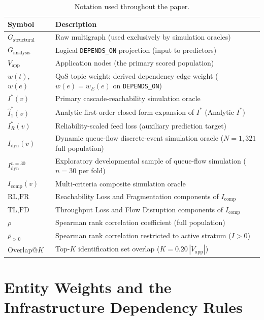 \documentclass[preprint,3p]{elsarticle}
\begin{document}
\begin{table}[htbp]
\centering
\small
\caption{Notation used throughout the paper.}
\label{tab:supp-notation}
\begin{tabular}{ll}
\toprule
\textbf{Symbol} & \textbf{Description} \\
\midrule
$G_{\text{structural}}$ & Raw multigraph (used exclusively by simulation oracles) \\
$G_{\text{analysis}}$   & Logical \texttt{DEPENDS\_ON} projection (input to predictors) \\
$V_{\text{app}}$        & Application nodes (the primary scored population) \\
$w(t)$, $w(e)$          & QoS topic weight; derived dependency edge weight ($w(e) = w_E(e)$ on \texttt{DEPENDS\_ON}) \\
$I^*(v)$                & Primary cascade-reachability simulation oracle \\
$\hat{I}^*_1(v)$        & Analytic first-order closed-form expansion of $I^*$ (Analytic $I^*$) \\
$I^*_R(v)$              & Reliability-scaled feed loss (auxiliary prediction target) \\
$I_{\text{dyn}}(v)$     & Dynamic queue-flow discrete-event simulation oracle ($N = 1{,}321$ full population) \\
$I_{\text{dyn}}^{n=30}$ & Exploratory developmental sample of queue-flow simulation ($n = 30$ per fold) \\
$I_{\text{comp}}(v)$    & Multi-criteria composite simulation oracle \\
$\text{RL}, \text{FR}$  & Reachability Loss and Fragmentation components of $I_{\text{comp}}$ \\
$\text{TL}, \text{FD}$  & Throughput Loss and Flow Disruption components of $I_{\text{comp}}$ \\
$\rho$                  & Spearman rank correlation coefficient (full population) \\
$\rho_{>0}$             & Spearman rank correlation restricted to active stratum ($I > 0$) \\
Overlap@$K$             & Top-$K$ identification set overlap ($K = 0.20\,|V_{\text{app}}|$) \\
\bottomrule
\end{tabular}
\end{table}

\section{Entity Weights and the Infrastructure Dependency Rules}
\label{supp:weights}
\end{document}
